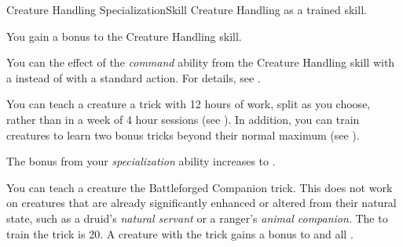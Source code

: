   \begin{feat}{Creature Handling Specialization}{Skill}
    \featpre Creature Handling as a trained skill.

     You gain a  bonus to the Creature Handling skill.

     You can  the effect of the \textit{command} ability from the Creature Handling skill with a  instead of with a standard action.
    For details, see .

     You can teach a creature a trick with 12 hours of work, split as you choose, rather than in a week of 4 hour sessions (see ).
    In addition, you can train creatures to learn two bonus tricks beyond their normal maximum (see ).

     The bonus from your \textit{specialization} ability increases to .

     You can teach a creature the Battleforged Companion trick.
    This does not work on creatures that are already significantly enhanced or altered from their natural state, such as a druid's \textit{natural servant} or a ranger's \textit{animal companion}.
    The  to train the trick is 20.
    A creature with the trick gains a  bonus to  and all .
  \end{feat}

